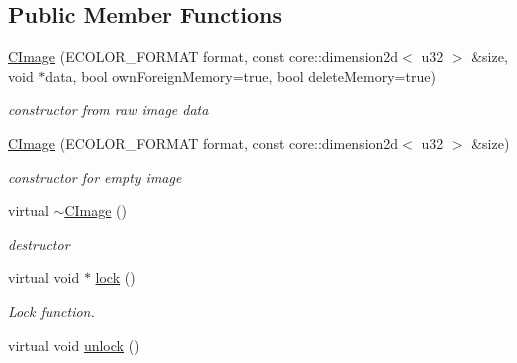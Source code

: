 \subsection*{Public Member Functions}
\begin{DoxyCompactItemize}
\item 
\hyperlink{classirr_1_1video_1_1_c_image_a33fb599ad55a8a75c27c5a8a268ab6c5}{C\-Image} (E\-C\-O\-L\-O\-R\-\_\-\-F\-O\-R\-M\-A\-T format, const core\-::dimension2d$<$ u32 $>$ \&size, void $\ast$data, bool own\-Foreign\-Memory=true, bool delete\-Memory=true)
\begin{DoxyCompactList}\small\item\em constructor from raw image data \end{DoxyCompactList}\item 
\hyperlink{classirr_1_1video_1_1_c_image_af2394e6328736041c35d80fb94f76258}{C\-Image} (E\-C\-O\-L\-O\-R\-\_\-\-F\-O\-R\-M\-A\-T format, const core\-::dimension2d$<$ u32 $>$ \&size)
\begin{DoxyCompactList}\small\item\em constructor for empty image \end{DoxyCompactList}\item 
\hypertarget{classirr_1_1video_1_1_c_image_a17b90b3c4c156f769bb9969eb7014d7a}{virtual \hyperlink{classirr_1_1video_1_1_c_image_a17b90b3c4c156f769bb9969eb7014d7a}{$\sim$\-C\-Image} ()}\label{classirr_1_1video_1_1_c_image_a17b90b3c4c156f769bb9969eb7014d7a}

\begin{DoxyCompactList}\small\item\em destructor \end{DoxyCompactList}\item 
\hypertarget{classirr_1_1video_1_1_c_image_afefb05230de4553a06973434284b791f}{virtual void $\ast$ \hyperlink{classirr_1_1video_1_1_c_image_afefb05230de4553a06973434284b791f}{lock} ()}\label{classirr_1_1video_1_1_c_image_afefb05230de4553a06973434284b791f}

\begin{DoxyCompactList}\small\item\em Lock function. \end{DoxyCompactList}\item 
\hypertarget{classirr_1_1video_1_1_c_image_ad453b4c5434cc115a97c6f6e5e9dd0ab}{virtual void \hyperlink{classirr_1_1video_1_1_c_image_ad453b4c5434cc115a97c6f6e5e9dd0ab}{unlock} ()}\label{classirr_1_1video_1_1_c_image_ad453b4c5434cc115a97c6f6e5e9dd0ab}


\end{DoxyCompactItemize}
